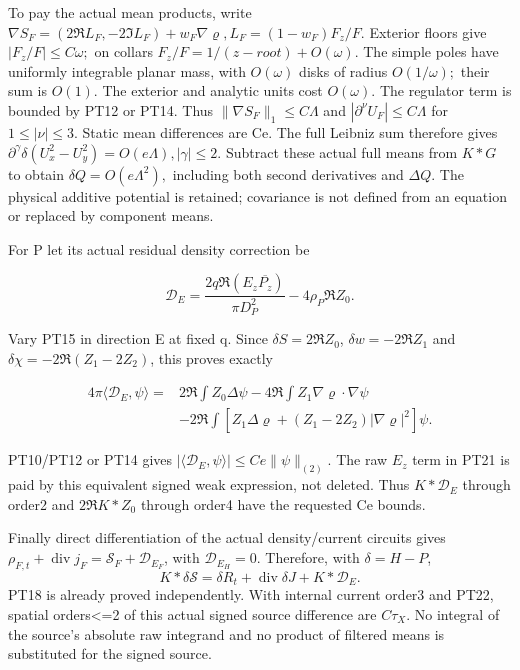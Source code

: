 To pay the actual mean products, write \(\nabla S_{F}=(2\Re L_{F},-2\Im L_{F})+w_{F} \nabla\varrho, L_{F}=(1-w_{F})F_{z}/F.\) Exterior floors give \(|F_{z}/F|\le C \omega;\) on collars \(F_{z}/F=1/(z-root)+O(\omega).\) The simple poles have uniformly integrable planar mass, with \(O(\omega)\) disks of radius \(O(1/\omega);\) their sum is \(O(1).\) The exterior and analytic units cost \(O(\omega).\) The regulator term is bounded by PT12 or PT14. Thus \(\|\nabla S_F\|_1\le C \Lambda\) and \(|\partial^{\nu} U_{F}|\le C \Lambda\) for \(1\le |\nu|\le 3.\) Static mean differences are Ce. The full Leibniz sum therefore gives \(\partial^{\gamma} \delta(U_{x}^{2}-U_{y}^{2})=O(e \Lambda), |\gamma|\le 2.\) Subtract these actual full means from \(K*G\) to obtain \(\delta Q=O(e \Lambda^{2}),\) including both second derivatives and \(\Delta Q.\) The physical additive potential is retained; covariance is not defined from an equation or replaced by component means.

For P let its actual residual density correction be

\[
\mathcal D_E=\frac{2q\Re(E_z\overline{P_z})}{\pi D_P^2}
                   -4\rho_P\Re Z_0.
\tag{PT21}\label{eq:ansatz-pt21}
\]

Vary PT15 in direction E at fixed q. Since $\delta S=2\Re Z_0$, $\delta w=-2\Re Z_1$ and $\delta\chi=-2\Re(Z_1-2Z_2)$, this proves exactly

\[
\begin{split}
4\pi\langle\mathcal D_E,\psi\rangle={}&2\Re\int Z_0\Delta\psi
 -4\Re\int Z_1\nabla\varrho\cdot\nabla\psi\\
 &-2\Re\int[Z_1\Delta\varrho
                  +(Z_1-2Z_2)|\nabla\varrho|^2]\psi.
\end{split}
\tag{PT22}\label{eq:ansatz-pt22}
\]

PT10/PT12 or PT14 gives $|\langle\mathcal D_E,\psi\rangle|\le Ce\|\psi\|_{(2)}$. The raw \(E_{z}\) term in PT21 is paid by this equivalent signed weak expression, not deleted. Thus \(K*\mathcal D_E\) through order2 and \(2\Re K*Z_{0}\) through order4 have the requested Ce bounds.

Finally direct differentiation of the actual density/current circuits gives
$\rho_{F,t}+\operatorname{div}j_F=\mathcal S_F+\mathcal D_{E_F}$,
with $\mathcal D_{E_H}=0$. Therefore, with $\delta=H-P$,
\[
 K*\delta\mathcal S=\delta R_t+\operatorname{div}\delta J+K*\mathcal D_E.
\]
PT18 is already proved independently. With internal current order3 and PT22, spatial orders<=2 of this actual signed source difference are \(C \tau_{X}.\) No integral of the source's absolute raw integrand and no product of filtered means is substituted for the signed source.


